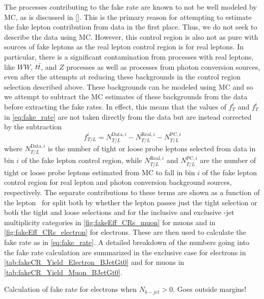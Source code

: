 The processes contributing to the fake rate are known
to not be well modeled by MC, as is discussed in \sec\ref{}.
This is the primary reason for attempting to estimate the fake
lepton contribution from data in the first place. Thus,
we do not seek to describe the data using MC.
However, this control region is also not as pure with sources
of fake leptons as the real lepton control region is for real leptons.
In particular, there is a significant contamination from processes
with real leptons, like $WW$, $t\bar{t}$, and $Z$ processes as well
as processes from photon conversion sources, even after the attempts
at reducing these backgrounds in the control region selection described above.
These backgrounds can be modeled using MC and so we attempt to subtract the
MC estimates of these backgrounds from the data before extracting the fake
rates. In effect, this means that the values of $f_{T}^{i}$ and
$f_{T}^i$ in \eqn\eqref{eq:fake_rate} are not taken directly from the
data but are instead corrected by the subtraction
\begin{equation}
f_{T/L}^{i} = 
N^{\textrm{Data},i}_{T/L} 
- N^{\textrm{Real},i}_{T/L}
- N^{\textrm{PC},i}_{T/L}
\end{equation}
where $N^{\textrm{Data},i}_{T/L}$ is the number of tight or loose
probe leptons selected from data in bin $i$ of the fake lepton control region,
while $N^{\textrm{Real},i}_{T/L}$  and $N^{\textrm{PC},i}_{T/L}$
are the number of tight or loose probe leptons estimated from MC
to fall in bin $i$ of the fake lepton control region for real
lepton and photon conversion background sources, respectively.
The separate contributions to these terms are shown as a function
of the lepton \pt~for split both by whether the lepton
passes just the tight selection or both the tight and loose selections
and for the inclusive and exclusive \bee-jet multiplicity categories
in \fig\ref{fig:fakeEff_CRs_muon} for muons
and in \fig\ref{fig:fakeEff_CRs_electron} for electrons.
These are then used to calculate the fake rate as in \eqn\eqref{eq:fake_rate}.
A detailed breakdown of the numbers going into the fake rate calculation
are summarized in the exclusive case for 
electrons in \tab\ref{tab:fakeCR_Yield_Electron_BJetGt0}
and for muons in \tab\ref{tab:fakeCR_Yield_Muon_BJetGt0}.


\begin{table}[ht!]

\caption{Calculation of fake rate for electrons when $N_{b-jet} > 0$. 
Goes outside margins!}
\label{tab:fakeCR_Yield_Electron_BJetGt0}
\end{table}

